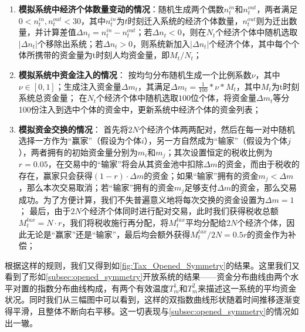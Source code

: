 \documentclass[tsinghuacite]{HustGraduPaper}
\begin{document}
		\begin{enumerate}[label=(\roman*)]
		
			\item {\bfseries 模拟系统中经济个体数量变动的情况}：随机生成两个偶数$n_{t}^{in}$和$n_{t}^{out}$，两者满足$0<n_{t}^{in}, n_{t}^{out}<30$，其中$n_{t}^{in}$为$t$时刻迁入系统的经济个体数量，$n_{t}^{out}$则为迁出数量，并计算差值$\Delta n_{t} = n_{t}^{in} - n_{t}^{out}$；若$\Delta n_{t} < 0$，则在$N_t$个经济个体中随机选取$ \lvert \Delta n_{t} \rvert $个移除出系统；若$\Delta n_{t} > 0$，则系统新加入$\lvert \Delta n_{t} \rvert $个经济个体，其中每个个体所携带的资金量为t时刻人均资金量，即$M_t / N_t$；

			
			\item {\bfseries 模拟系统中资金注入的情况}： 按均匀分布随机生成一个比例系数$\nu$，其中$\nu \in [0,1]$；生成注入资金量$\Delta m_t$，其满足$\Delta m_t =  \frac{1}{100} * \nu * M_t $，其中$M_t$为t时刻系统总资金量； 在$N_t$个经济个体中随机选取$100$位个体，将资金量$\Delta m_t$等分100份注入到选中个体的资金中，更新系统中经济个体的资金列表；
				
			
			\item {\bfseries 模拟资金交换的情况}： 首先将$2N$个经济个体两两配对，然后在每一对中随机选择一方作为“赢家”（假设为个体$i$），另一方自然成为“输家”（假设为个体$j$），两者拥有的初始资金量分别为$m_i$和$m_j$；其次设置恒定的税收比例为$r=0.05$，在交易中的“输家”将会从其资金池中扣除$\Delta m$的资金，而由于税收的存在，赢家只会获得$ (1-r) \cdot \Delta m$的资金；如果“输家”拥有的资金$m_{j} < \Delta m$，那么本次交易取消；若“输家”拥有的资金$m_j$足够支付$\Delta m$的资金，那么交易成功。为了方便计算，我们不失普遍意义地将每次交换的资金设置为$\Delta m =  1$； 最后，由于$2N$个经济个体同时进行配对交易，此时我们获得税收总额$M_t^{tax} = N \cdot r$，我们将税收施行再分配，将$M_t^{tax}$平均分配给$2N$个经济个体，因此无论是“赢家”还是“输家”，最后均会额外获得$M_t^{tax}/2N = 0.5r$的资金作为补偿；
			
		\end{enumerate}
		
		根据这样的规则，我们又得到如\autoref{fig:Tax_Opened_Symmetry}的结果。这里我们又看到了形如\autoref{subsec:opened_symmetry}开放系统的结果——资金分布曲线由两个水平对置的指数分布曲线构成，有两个有效温度$T_m^{1}$和$T_m^{2}$来描述这一系统的平均资金状况。同时我们从三幅图中可以看到，这样的双指数曲线形状随着时间推移逐渐变得平滑，且整体不断向右平移。这一切表现与\autoref{subsec:opened_symmetry}的情况如出一辙。
				
\end{document}
